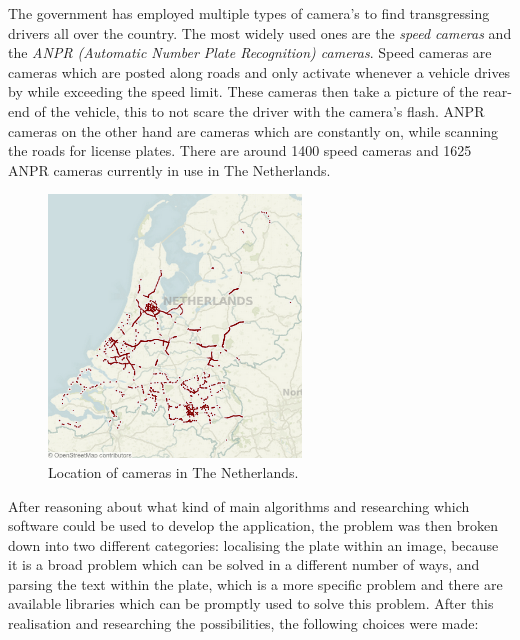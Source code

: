 
The government has employed multiple types of camera's to find transgressing drivers all over the country. The most widely used ones are the \emph{speed cameras} and the \emph{ANPR (Automatic Number Plate Recognition) cameras}. Speed cameras are cameras which are posted along roads and only activate whenever a vehicle drives by while exceeding the speed limit. These cameras then take a picture of the rear-end of the vehicle, this to not scare the driver with the camera's flash. ANPR cameras on the other hand are cameras which are constantly on, while scanning the roads for license plates. There are around 1400 \cite{speed-cameras} speed cameras and 1625 \cite{anpr-cameras} ANPR cameras currently in use in The Netherlands.

\begin{figure}[ht]
    \centering
    \includegraphics[width=0.6\textwidth]{plaatjes/anpr-cameras}
    \caption{Location of cameras in The Netherlands.}
    \label{fig:cameras-netherlands}
\end{figure}%



After reasoning about what kind of main algorithms and researching which software could be used to develop the application, the problem was then broken down into two different categories: localising the plate within an image, because it is a broad problem which can be solved in a different number of ways, and parsing the text within the plate, which is a more specific problem and there are available libraries which can be promptly used to solve this problem. After this realisation and researching the possibilities, the following choices were made:

